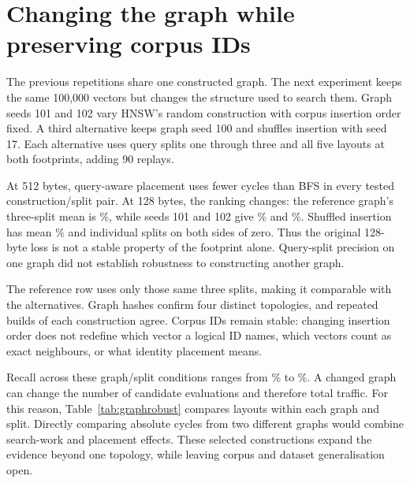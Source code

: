 \section{Changing the graph while preserving corpus IDs}
The previous repetitions share one constructed graph. The next experiment keeps the same 100,000 vectors but changes the structure used to search them. Graph seeds 101 and 102 vary HNSW's random construction with corpus insertion order fixed. A third alternative keeps graph seed 100 and shuffles insertion with seed 17. Each alternative uses query splits one through three and all five layouts at both footprints, adding 90 replays.

\begin{table}[htbp]\centering\small
\caption[Graph-construction robustness]{Query-aware/BFS cycle differences for four constructions on the same three query splits. The mean and minimum/maximum describe these observations; the range is not a confidence interval over possible graphs.}\label{tab:graphrobust}

\end{table}

At 512 bytes, query-aware placement uses fewer cycles than BFS in every tested construction/split pair. At 128 bytes, the ranking changes: the reference graph's three-split mean is \GraphRefCompact\%, while seeds 101 and 102 give \GraphOneCompact\% and \GraphTwoCompact\%. Shuffled insertion has mean \GraphShuffleCompact\% and individual splits on both sides of zero. Thus the original 128-byte loss is not a stable property of the footprint alone. Query-split precision on one graph did not establish robustness to constructing another graph.

The reference row uses only those same three splits, making it comparable with the alternatives. Graph hashes confirm four distinct topologies, and repeated builds of each construction agree. Corpus IDs remain stable: changing insertion order does not redefine which vector a logical ID names, which vectors count as exact neighbours, or what identity placement means.

Recall across these graph/split conditions ranges from \GraphRecallMin\% to \GraphRecallMax\%. A changed graph can change the number of candidate evaluations and therefore total traffic. For this reason, Table~\ref{tab:graphrobust} compares layouts within each graph and split. Directly comparing absolute cycles from two different graphs would combine search-work and placement effects. These selected constructions expand the evidence beyond one topology, while leaving corpus and dataset generalisation open.

